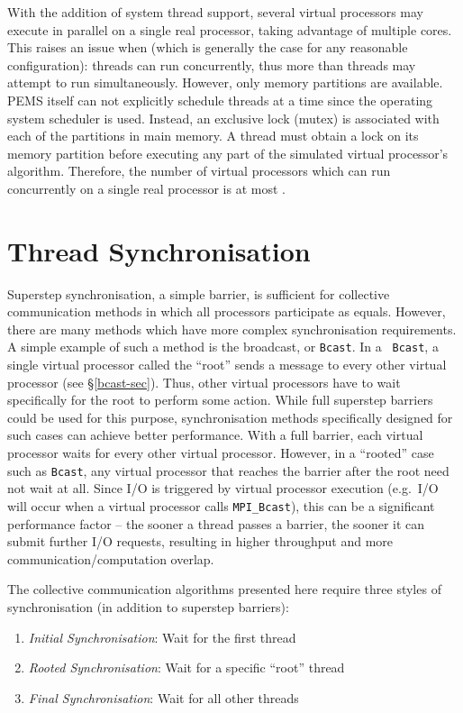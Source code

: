 \documentclass[12pt]{carletoncsthesis}
\begin{document}
With the addition of system thread support, several virtual processors may
execute in parallel on a single real processor, taking advantage of multiple
cores.  This raises an issue when  (which is generally the
case for any reasonable configuration): threads can run concurrently, thus
more than  threads may attempt to run simultaneously.  However, only 
memory partitions are available.  PEMS itself can not explicitly schedule
threads  at a time since the operating system scheduler is used.  Instead,
an exclusive lock (mutex) is associated with each of the  partitions
in main memory.  A thread must obtain a lock on its memory partition before
executing any part of the simulated virtual processor's algorithm.  Therefore,
the number of virtual processors which can run concurrently on a single real
processor is at most .

\section{Thread Synchronisation}
\label{synchronisation}


Superstep synchronisation, a simple barrier, is sufficient for collective
communication methods in which all processors participate as equals.  However,
there are many methods which have more complex synchronisation requirements.
A simple example of such a method is the broadcast, or {\tt Bcast}.  In a {\tt
Bcast}, a single virtual processor called the ``root'' sends a message to
every other virtual processor (see \S\ref{bcast-sec}).  Thus, other virtual
processors have to wait specifically for the root to perform some action.
While full superstep barriers could be used for this purpose, synchronisation
methods specifically designed for such cases can achieve better performance.
With a full barrier, each virtual processor waits for every other virtual
processor.  However, in a ``rooted'' case such as {\tt Bcast}, any virtual
processor that reaches the barrier after the root need not wait at all.
Since I/O is triggered by virtual processor execution (e.g.\ I/O will occur
when a virtual processor calls {\tt MPI\_Bcast}), this can be a significant
performance factor -- the sooner a thread passes a barrier, the sooner it
can submit further I/O requests, resulting in higher throughput and more
communication/computation overlap.

The collective communication algorithms presented here require three
styles of synchronisation (in addition to superstep barriers):

\begin{enumerate}
\item {\em Initial Synchronisation}: Wait for the first thread
\item {\em Rooted Synchronisation}: Wait for a specific ``root'' thread
\item {\em Final Synchronisation}: Wait for all other threads
\end{enumerate}
\end{document}
